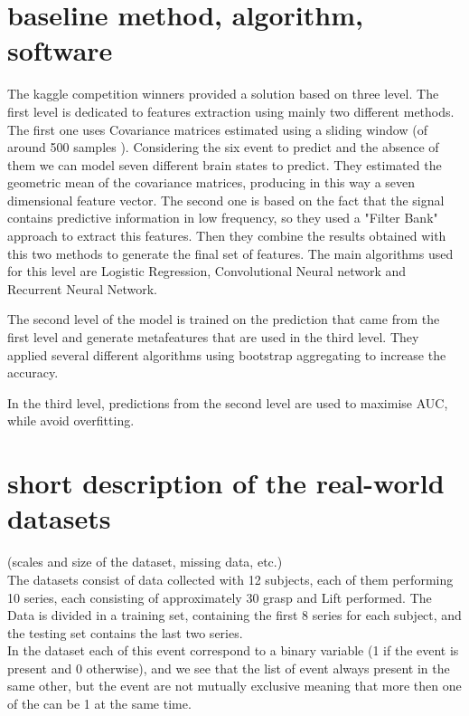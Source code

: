 \documentclass[final,leqno,onefignum,onetabnum]{siamltexmm}
\begin{document}
\section{baseline method, algorithm, software}
The kaggle competition winners \cite{kaggle} provided a solution based on three level. The first level is dedicated to features extraction using mainly two different methods. The first one uses Covariance matrices  estimated using a sliding window (of around 500 samples ). Considering the six event to predict and the absence of them we can model seven different brain states to predict. They estimated the geometric mean of the covariance matrices, producing in this way a seven dimensional feature vector. The second one is based on the fact that the signal contains predictive information in low frequency, so they used a  "Filter Bank" approach to extract this features. Then they combine the results obtained with this two methods to generate the final set of features. 
The main algorithms used for this level are Logistic Regression, Convolutional Neural network and Recurrent Neural Network. 

The second level of the model is trained on the prediction that came from the first level and generate metafeatures that are used in the third level. They applied several different algorithms using bootstrap aggregating to increase the accuracy.

In the third level, predictions from the second level are used to maximise  AUC, while avoid overfitting. 
 







\section{short description of the real-world datasets}
(scales and size of the dataset, missing data, etc.)\\
The  datasets consist of data collected with 12 subjects, each of them performing 10 series, each consisting of approximately 30 grasp and Lift performed. The Data is divided in a  training set, containing the first 8 series for each subject, and  the testing set contains the last two series.\\
In the dataset each of this event correspond to a binary variable (1 if the event is present and 0 otherwise), and we see that the list of event always present in the same other, but the event are not mutually exclusive meaning that more then one of the can be 1 at the same time.\\
 
\end{document}

